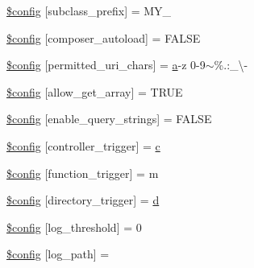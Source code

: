 \begin{DoxyCompactItemize}
\item 
\hyperlink{_admin_2application_2config_2config_8php_a51b79c9e455d64cb54212f2966b28ae6}{\$config} \mbox{[}\textquotesingle{}subclass\+\_\+prefix\textquotesingle{}\mbox{]} = \textquotesingle{}M\+Y\+\_\+\textquotesingle{}
\item 
\hyperlink{_admin_2application_2config_2config_8php_ac8ab0111ebe9c372fb22c673ed923f0d}{\$config} \mbox{[}\textquotesingle{}composer\+\_\+autoload\textquotesingle{}\mbox{]} = F\+A\+L\+S\+E
\item 
\hyperlink{_admin_2application_2config_2config_8php_ae2e36375b245287a8851ac04565994de}{\$config} \mbox{[}\textquotesingle{}permitted\+\_\+uri\+\_\+chars\textquotesingle{}\mbox{]} = \textquotesingle{}\hyperlink{_admin_2assets_2js_2bootstrap_8min_8js_a1f5870dcf487187f13d5fd328ed9e6e7}{a}-\/z 0-\/9$\sim$\%.\+:\+\_\+\textbackslash{}-\/\textquotesingle{}
\item 
\hyperlink{_admin_2application_2config_2config_8php_ac714a2702b430e47833d82d6ee590298}{\$config} \mbox{[}\textquotesingle{}allow\+\_\+get\+\_\+array\textquotesingle{}\mbox{]} = T\+R\+U\+E
\item 
\hyperlink{_admin_2application_2config_2config_8php_a227b7a6fec0306454ffb0dead1f1c4f7}{\$config} \mbox{[}\textquotesingle{}enable\+\_\+query\+\_\+strings\textquotesingle{}\mbox{]} = F\+A\+L\+S\+E
\item 
\hyperlink{_admin_2application_2config_2config_8php_a7ea9e139536f27af75812de53e852829}{\$config} \mbox{[}\textquotesingle{}controller\+\_\+trigger\textquotesingle{}\mbox{]} = \textquotesingle{}\hyperlink{_admin_2assets_2js_2bootstrap_8min_8js_ad9d1ac02e33c4aed62ad517a7cb8b3fb}{c}\textquotesingle{}
\item 
\hyperlink{_admin_2application_2config_2config_8php_acac6a7410b2ae72152894e3b93501811}{\$config} \mbox{[}\textquotesingle{}function\+\_\+trigger\textquotesingle{}\mbox{]} = \textquotesingle{}m\textquotesingle{}
\item 
\hyperlink{_admin_2application_2config_2config_8php_af7e6593d4088b77d153dafff4567f143}{\$config} \mbox{[}\textquotesingle{}directory\+\_\+trigger\textquotesingle{}\mbox{]} = \textquotesingle{}\hyperlink{_admin_2assets_2js_2bootstrap_8min_8js_aeb337d295abaddb5ec3cb34cc2e2bbc9}{d}\textquotesingle{}
\item 
\hyperlink{_admin_2application_2config_2config_8php_a7e7fe9a5aa2c85e48865b154035dab6a}{\$config} \mbox{[}\textquotesingle{}log\+\_\+threshold\textquotesingle{}\mbox{]} = 0
\item 
\hyperlink{_admin_2application_2config_2config_8php_aee8524f2388d21b1c73de5c48a82b687}{\$config} \mbox{[}\textquotesingle{}log\+\_\+path\textquotesingle{}\mbox{]} = \textquotesingle{}\textquotesingle{}

\end{DoxyCompactItemize}
